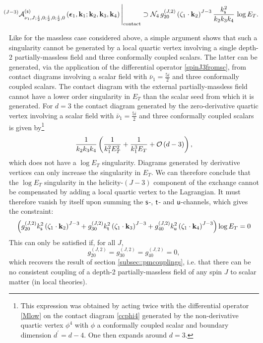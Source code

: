 \documentclass[11pt,a4paper]{article}
\begin{document}
\begin{equation}
 \hspace*{-0.3cm}   {}^{\left(J-3\right)}{\cal A}^{\left({\sf s}\right)}_{\nu_1,J;\frac{i}{2},0;\frac{i}{2},0;\frac{i}{2},0}\left(\boldsymbol{\epsilon}_1,{\bf k}_1;{\bf k}_2,{\bf k}_3,{\bf k}_4\right)\Bigg|_{\text{contact}} \supset {\cal N}_4\,g^{\left(J,2\right)}_{20}\left(\zeta_1 \cdot {\bf k}_2\right)^{J-3} \frac{k^2_{\sf s}}{k_2 k_3 k_4}\,\log E_T.
\end{equation}

Like for the massless case considered above, a simple argument shows that such a singularity cannot be generated by a local quartic vertex involving a single depth-2 partially-massless field and three conformally coupled scalars. The latter can be generated, via the application of the differential operator \eqref{spinJ3fromsc}, from contact diagrams involving a scalar field with ${\bar \nu}_1=\tfrac{5i}{2}$ and three conformally coupled scalars. The contact diagram with the external partially-massless field cannot have a lower order singularity in $E_T$ than the scalar seed from which it is generated. For $d=3$ the contact diagram generated by the zero-derivative quartic vertex involving a scalar field with ${\bar \nu}_1=\tfrac{5i}{2}$ and three conformally coupled scalars is given by\footnote{This expression was obtained by acting twice with the differential operator \eqref{Mlow} on the contact diagram \eqref{ccphi4} generated by the non-derivative quartic vertex $\phi^4$ with $\phi$ a conformally coupled scalar and boundary dimension $d^\prime=d-4$. One then expands around $d=3$.} 
\begin{equation}
    \frac1{k_2k_3k_4}\left(\frac{1}{k^2_1 E^{2}_T}+ \frac{1}{k^3_1 E_T} +{\cal O}\left(d-3\right)\right),
\end{equation}
which does not have a $\log E_T$ singularity. Diagrams generated by derivative vertices can only increase the singularity in $E_T$. We can therefore conclude that the $\log E_T$ singularity in the helicity-$\left(J-3\right)$ component of the exchange cannot be compensated by adding a local quartic vertex to the Lagrangian. It must therefore vanish by itself upon summing the ${\sf s}$-, ${\sf t}$- and ${\sf u}$-channels, which gives the constraint:
\begin{equation}
  \left( g^{\left(J,2\right)}_{20}k^2_{\sf s}\left(\zeta_1 \cdot {\bf k}_2\right)^{J-3}+g^{\left(J,2\right)}_{30}k^2_{\sf t}\left(\zeta_1 \cdot {\bf k}_3\right)^{J-3}+g^{\left(J,2\right)}_{40}k^2_{\sf u}\left(\zeta_1 \cdot {\bf k}_4\right)^{J-3}\right)\log E_T=0
\end{equation}
This can only be satisfied if, for all $J$,
\begin{equation}
  g^{\left(J,2\right)}_{20}=g^{\left(J,2\right)}_{30}=g^{\left(J,2\right)}_{40}=0,
\end{equation}
which recovers the result of section \ref{subsec::pmcouplings}, i.e. that there can be no consistent coupling of a depth-2 partially-massless field of any spin $J$ to scalar matter (in local theories).
\end{document}
